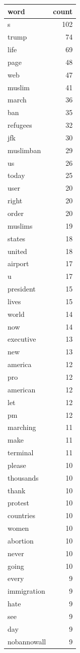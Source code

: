 \begin{tabular}{lr}
\toprule
word & count \\
\midrule
s & 102 \\
trump & 74 \\
life & 69 \\
page & 48 \\
web & 47 \\
muslim & 41 \\
march & 36 \\
ban & 35 \\
refugees & 32 \\
jfk & 30 \\
muslimban & 29 \\
us & 26 \\
today & 25 \\
user & 20 \\
right & 20 \\
order & 20 \\
muslims & 19 \\
states & 18 \\
united & 18 \\
airport & 17 \\
u & 17 \\
president & 15 \\
lives & 15 \\
world & 14 \\
now & 14 \\
executive & 13 \\
new & 13 \\
america & 12 \\
pro & 12 \\
american & 12 \\
let & 12 \\
pm & 12 \\
marching & 11 \\
make & 11 \\
terminal & 11 \\
please & 10 \\
thousands & 10 \\
thank & 10 \\
protest & 10 \\
countries & 10 \\
women & 10 \\
abortion & 10 \\
never & 10 \\
going & 10 \\
every & 9 \\
immigration & 9 \\
hate & 9 \\
see & 9 \\
day & 9 \\
nobannowall & 9 \\
\bottomrule
\end{tabular}
